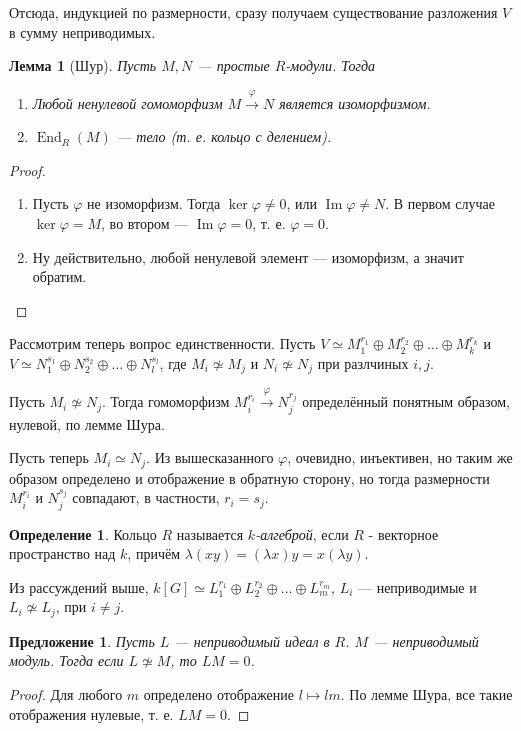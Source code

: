 \documentclass{article}
\newtheorem*{lemma}{Лемма}
\newtheorem*{proposition}{Предложение}
\theoremstyle{definition}
\newtheorem*{definition}{Определение}
\theoremstyle{remark}
\DeclareMathOperator{\End}{End}
\DeclareMathOperator{\im}{Im}
\begin{document}
Отсюда, индукцией по размерности, сразу получаем существование разложения $V$ в сумму неприводимых.

\begin{lemma}[Шур]
Пусть $M, N$ --- простые $R$-модули. Тогда
\begin{enumerate}
\item Любой ненулевой гомоморфизм $M \xrightarrow{\varphi} N$ является изоморфизмом.
\item $\End_R(M)$ --- тело (т. е. кольцо с делением).
\end{enumerate}
\end{lemma}
\begin{proof} \quad
\begin{enumerate}
\item Пусть $\varphi$ не изоморфизм. Тогда $\ker \varphi \neq 0$, или $\im \varphi \neq N$. В первом случае $\ker \varphi = M$, во втором --- $\im \varphi = 0$, т. е. $\varphi = 0$.
\item Ну действительно, любой ненулевой элемент --- изоморфизм, а значит обратим.
\end{enumerate}
\end{proof}
Рассмотрим теперь вопрос единственности. Пусть $V \simeq M_1^{r_1} \oplus M_2^{r_2} \oplus \ldots \oplus M_k^{r_k}$ и $V \simeq N_1^{s_1} \oplus N_2^{s_2} \oplus \ldots \oplus N_l^{s_l}$, где $M_i \not \simeq M_j$ и $N_i \not \simeq N_j$ при разлчиных $i, j$.

Пусть $M_i \not \simeq N_j$. Тогда гомоморфизм $M_i^{r_i} \xrightarrow{\varphi} N_j^{r_j}$ определённый понятным образом, нулевой, по лемме Шура. 

Пусть теперь $M_i \simeq N_j$. Из вышесказанного $\varphi$, очевидно, инъективен, но таким же образом определено и отображение в обратную сторону, но тогда размерности $M_i^{r_i}$ и $N_j^{s_j}$ совпадают, в частности, $r_i = s_j$.

\begin{definition}
Кольцо $R$ называется \textit{$k$-алгеброй}, если $R$ - векторное пространство над $k$, причём $\lambda(xy) = (\lambda x)y = x(\lambda y)$.
\end{definition}

Из рассуждений выше, $k[G] \simeq L_1^{r_1} \oplus L_2^{r_2} \oplus \ldots \oplus L_m^{r_m}$, $L_i$ --- неприводимые и $L_i \not \simeq L_j$, при $i \neq j$.

\begin{proposition}
Пусть $L$ --- неприводимый идеал в $R$. $M$ --- неприводимый модуль. Тогда если $L \not \simeq M$, то $LM = 0$.
\end{proposition}
\begin{proof}
Для любого $m$ определено отображение $l \mapsto lm$. По лемме Шура, все такие отображения нулевые, т. е. $LM = 0$.
\end{proof}
\end{document}
